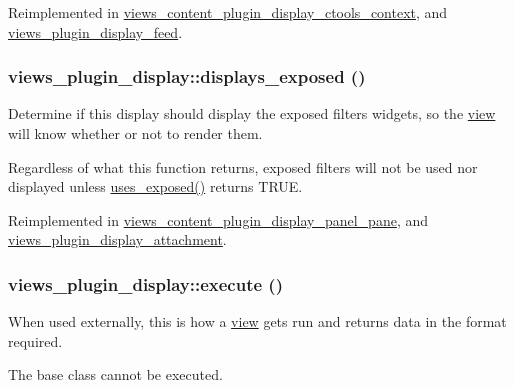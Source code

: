 Reimplemented in \hyperlink{classviews__content__plugin__display__ctools__context_aac45cef6f7701e14689186da1cf10b92}{views\_\-content\_\-plugin\_\-display\_\-ctools\_\-context}, and \hyperlink{classviews__plugin__display__feed_aadbff7e4fb0bc05dfee8bc38ea1349dc}{views\_\-plugin\_\-display\_\-feed}.\hypertarget{classviews__plugin__display_a47058532874d0bc5448b53e0a98489cc}{
\subsubsection[{displays\_\-exposed}]{\setlength{\rightskip}{0pt plus 5cm}views\_\-plugin\_\-display::displays\_\-exposed ()}}
\label{classviews__plugin__display_a47058532874d0bc5448b53e0a98489cc}
Determine if this display should display the exposed filters widgets, so the \hyperlink{classview}{view} will know whether or not to render them.

Regardless of what this function returns, exposed filters will not be used nor displayed unless \hyperlink{classviews__plugin__display_a5bfcb22187618f52bea9ea626aff18a4}{uses\_\-exposed()} returns TRUE. 

Reimplemented in \hyperlink{classviews__content__plugin__display__panel__pane_a4e8cffaa9d5573babc19db650702e07f}{views\_\-content\_\-plugin\_\-display\_\-panel\_\-pane}, and \hyperlink{classviews__plugin__display__attachment_aa047b05c7d1e48bd2ec6c98a27720ebf}{views\_\-plugin\_\-display\_\-attachment}.\hypertarget{classviews__plugin__display_af99c4a303d3e409ab7b14c6cfcd3a1d8}{
\subsubsection[{execute}]{\setlength{\rightskip}{0pt plus 5cm}views\_\-plugin\_\-display::execute ()}}
\label{classviews__plugin__display_af99c4a303d3e409ab7b14c6cfcd3a1d8}
When used externally, this is how a \hyperlink{classview}{view} gets run and returns data in the format required.

The base class cannot be executed. 

